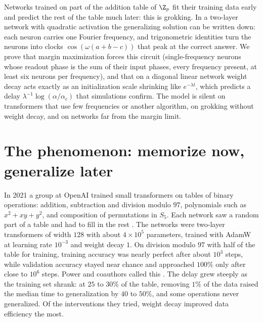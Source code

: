 \newcommand{\grokZp}{\Z_p}
\newcommand{\grokmem}{t_{\mathrm{mem}}}
\newcommand{\grokt}{t_{\mathrm{grok}}}
\newcommand{\grokcw}{\bar\gamma}
\newcommand{\grokii}{\mathrm{i}}

\begin{refsection}

\begin{chaptersummary}
Networks trained on part of the addition table of $\Z_p$ fit their training data early and predict the rest of the table much later: this is grokking. In a two-layer network with quadratic activation the generalizing solution can be written down: each neuron carries one Fourier frequency, and trigonometric identities turn the neurons into clocks $\cos(\omega(a+b-c))$ that peak at the correct answer. We prove that margin maximization forces this circuit (single-frequency neurons whose readout phase is the sum of their input phases, every frequency present, at least six neurons per frequency), and that on a diagonal linear network weight decay acts exactly as an initialization scale shrinking like $e^{-\lambda t}$, which predicts a delay $\lambda^{-1}\log(\alpha/\alpha_c)$ that simulations confirm. The model is silent on transformers that use few frequencies or another algorithm, on grokking without weight decay, and on networks far from the margin limit.
\end{chaptersummary}

\section{The phenomenon: memorize now, generalize later}\label{sec:grokking:phenomenon}

In 2021 a group at OpenAI trained small transformers on tables of binary operations: addition, subtraction and division modulo $97$, polynomials such as $x^2+xy+y^2$, and composition of permutations in $S_5$. Each network saw a random part of a table and had to fill in the rest \parencite{PowerEtAl2022}. The networks were two-layer transformers of width $128$ with about $4\times10^5$ parameters, trained with AdamW at learning rate $10^{-3}$ and weight decay $1$. On division modulo $97$ with half of the table for training, training accuracy was nearly perfect after about $10^3$ steps, while validation accuracy stayed near chance and approached $100\%$ only after close to $10^6$ steps. Power and coauthors called this . The delay grew steeply as the training set shrank: at $25$ to $30\%$ of the table, removing $1\%$ of the data raised the median time to generalization by $40$ to $50\%$, and some operations never generalized. Of the interventions they tried, weight decay improved data efficiency the most.


\end{refsection}
